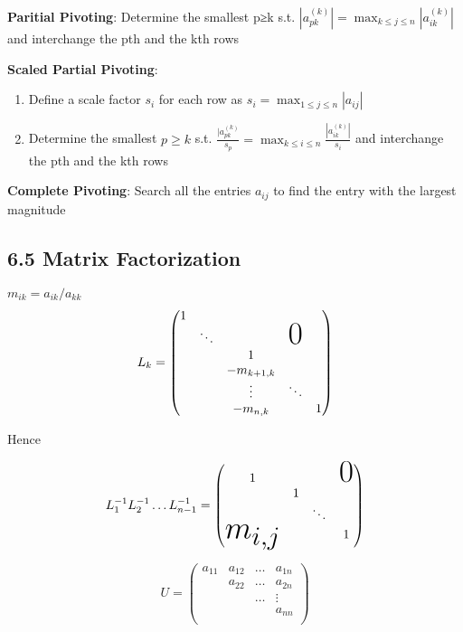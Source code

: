 \documentclass[11pt]{article}
\begin{document}
\textbf{Paritial Pivoting}: Determine the smallest p≥k s.t.
 \(|a_{pk}^{(k)}|=\displaystyle\max_{k\le j\le n}|a_{ik}^{(k)}|\) and
 interchange the pth and the kth rows

\textbf{Scaled Partial Pivoting}:
\begin{enumerate}
\item Define a scale factor \(s_i\) for each row as \(s_i=\displaystyle\max_{1\le
       j\le n}|a_{ij}|\)
\item Determine the smallest \(p\ge k\) s.t.
\(\frac{|a_{pk}^{(k)}}{s_p}=\displaystyle\max_{k\le i\le
       n}\frac{|a_{ik}^{(k)}|}{s_i}\)
and interchange the pth and the kth rows
\end{enumerate}


\textbf{Complete Pivoting}: Search all the entries \(a_{ij}\) to find the entry with
 the largest magnitude
\subsection{6.5 Matrix Factorization}
\label{sec:org2886d3f}
\(m_{ik}=a_{ik}/a_{kk}\)
\begin{equation*}
L_k=
\begin{pmatrix}
1 &            &            &               &  \\
  & \ddots     &            &\mbox{\Huge 0} &  \\
  &            & 1          &               &  \\
  &            & -m_{k+1,k} &               &  \\
  &            & \vdots     & \ddots        &  \\
  &            & -m_{n,k}   &               & 1\\
\end{pmatrix}
\end{equation*}  


Hence 

\begin{equation*}
L_1^{-1}L_2^{-1}\dots L_{n-1}^{-1}=
\begin{pmatrix}
1&&&\mbox{\Huge 0}\\
&1&&\\
&&\ddots&\\
\text{\Huge $m_{i,j}$}&&&1\\
\end{pmatrix}
\end{equation*}

\begin{equation*}
U=
\begin{pmatrix}
a_{11}&a_{12}&\dots&a_{1n}\\
&a_{22}&\dots&a_{2n}\\
&&\dots&\vdots\\
&&&a_{nn}\\
\end{pmatrix}
\end{equation*}
\end{document}
